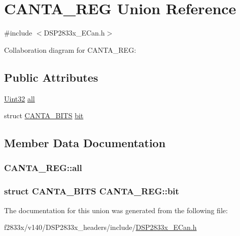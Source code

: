 \hypertarget{union_c_a_n_t_a___r_e_g}{}\section{C\+A\+N\+T\+A\+\_\+\+R\+E\+G Union Reference}
\label{union_c_a_n_t_a___r_e_g}


{\ttfamily \#include $<$D\+S\+P2833x\+\_\+\+E\+Can.\+h$>$}



Collaboration diagram for C\+A\+N\+T\+A\+\_\+\+R\+E\+G\+:
\subsection*{Public Attributes}
\begin{DoxyCompactItemize}
\item 
\hyperlink{_d_s_p2833x___device_8h_aba99025e657f892beb7ff31cecf64653}{Uint32} \hyperlink{union_c_a_n_t_a___r_e_g_ada5a2c54e12b17fa4ee59af25b084d33}{all}
\item 
struct \hyperlink{struct_c_a_n_t_a___b_i_t_s}{C\+A\+N\+T\+A\+\_\+\+B\+I\+T\+S} \hyperlink{union_c_a_n_t_a___r_e_g_a8d2e656c27274602d4bd1d03eb8c7b30}{bit}
\end{DoxyCompactItemize}


\subsection{Member Data Documentation}
\hypertarget{union_c_a_n_t_a___r_e_g_ada5a2c54e12b17fa4ee59af25b084d33}{}
\subsubsection[{all}]{ C\+A\+N\+T\+A\+\_\+\+R\+E\+G\+::all}\label{union_c_a_n_t_a___r_e_g_ada5a2c54e12b17fa4ee59af25b084d33}
\hypertarget{union_c_a_n_t_a___r_e_g_a8d2e656c27274602d4bd1d03eb8c7b30}{}
\subsubsection[{bit}]{\setlength{\rightskip}{0pt plus 5cm}struct {\bf C\+A\+N\+T\+A\+\_\+\+B\+I\+T\+S} C\+A\+N\+T\+A\+\_\+\+R\+E\+G\+::bit}\label{union_c_a_n_t_a___r_e_g_a8d2e656c27274602d4bd1d03eb8c7b30}


The documentation for this union was generated from the following file\+:\begin{DoxyCompactItemize}
\item 
f2833x/v140/\+D\+S\+P2833x\+\_\+headers/include/\hyperlink{_d_s_p2833x___e_can_8h}{D\+S\+P2833x\+\_\+\+E\+Can.\+h}\end{DoxyCompactItemize}
